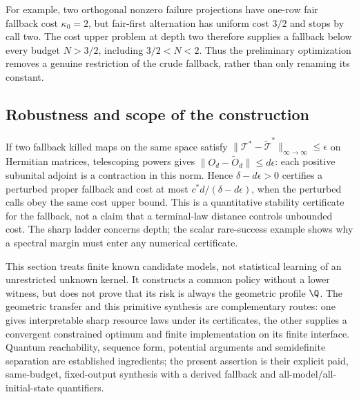 For example, two orthogonal nonzero failure projections have one-row fair fallback cost $\kappa_0=2$, but fair-first alternation has uniform cost $3/2$ and stops by call two. The cost upper problem at depth two therefore supplies a fallback below every budget $N>3/2$, including $3/2<N<2$. Thus the preliminary optimization removes a genuine restriction of the crude fallback, rather than only renaming its constant.

\subsection{Robustness and scope of the construction}
If two fallback killed maps on the same space satisfy
$\|\mathcal T^*-\widetilde{\mathcal T}^*\|_{\infty\to\infty}\le\epsilon$
on Hermitian matrices, telescoping powers gives
$\|O_d-\widetilde O_d\|\le d\epsilon$: each positive subunital adjoint is a contraction in this norm. Hence $\delta-d\epsilon>0$ certifies a perturbed proper fallback and cost at most $c^*d/(\delta-d\epsilon)$, when the perturbed calls obey the same cost upper bound. This is a quantitative stability certificate for the fallback, not a claim that a terminal-law distance controls unbounded cost. The sharp ladder concerns depth; the scalar rare-success example shows why a spectral margin must enter any numerical certificate.

This section treats finite known candidate models, not statistical learning of an unrestricted unknown kernel. It constructs a common policy without a lower witness, but does not prove that its risk is always the geometric profile $\Q$. The geometric transfer and this primitive synthesis are complementary routes: one gives interpretable sharp resource laws under its certificates, the other supplies a convergent constrained optimum and finite implementation on its finite interface. Quantum reachability, sequence form, potential arguments and semidefinite separation are established ingredients; the present assertion is their explicit paid, same-budget, fixed-output synthesis with a derived fallback and all-model/all-initial-state quantifiers.
